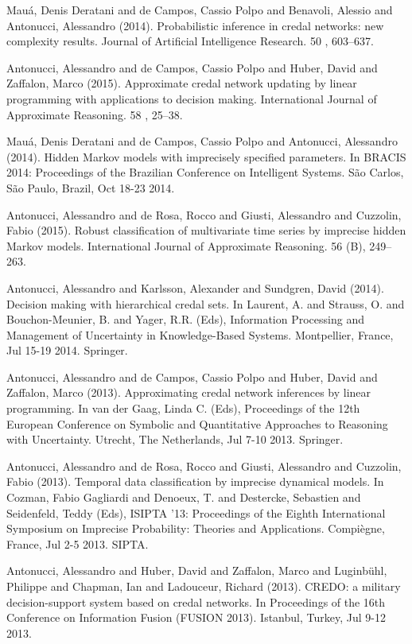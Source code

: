 \begin{cventries}
\begin{cvitems}
\item Mauá, Denis Deratani and de Campos, Cassio Polpo and Benavoli, Alessio and Antonucci, Alessandro (2014).   Probabilistic inference in credal networks: new complexity results.   Journal of Artificial Intelligence Research. 50 , 603–637.
\item Antonucci, Alessandro and de Campos, Cassio Polpo and Huber, David and Zaffalon, Marco (2015).   Approximate credal network updating by linear programming with applications to decision making.   International Journal of Approximate Reasoning. 58 , 25–38.
\item Mauá, Denis Deratani and de Campos, Cassio Polpo and Antonucci, Alessandro (2014).   Hidden Markov models with imprecisely specified parameters.   In BRACIS 2014: Proceedings of the Brazilian Conference on Intelligent Systems.   São Carlos, São Paulo, Brazil,   Oct 18-23 2014.
\item Antonucci, Alessandro and de Rosa, Rocco and Giusti, Alessandro and Cuzzolin, Fabio (2015).   Robust classification of multivariate time series by imprecise hidden Markov models.   International Journal of Approximate Reasoning. 56 (B), 249–263.
\item Antonucci, Alessandro and Karlsson, Alexander and Sundgren, David (2014).   Decision making with hierarchical credal sets.   In Laurent, A. and Strauss, O. and Bouchon-Meunier, B. and Yager, R.R. (Eds), Information Processing and Management of Uncertainty in Knowledge-Based Systems.   Montpellier, France,   Jul 15-19 2014.   Springer.
\item Antonucci, Alessandro and de Campos, Cassio Polpo and Huber, David and Zaffalon, Marco (2013).   Approximating credal network inferences by linear programming.   In van der Gaag, Linda C. (Eds), Proceedings of the 12th European Conference on Symbolic and Quantitative Approaches to Reasoning with Uncertainty.   Utrecht, The Netherlands,   Jul 7-10 2013.   Springer.
\item Antonucci, Alessandro and de Rosa, Rocco and Giusti, Alessandro and Cuzzolin, Fabio (2013).   Temporal data classification by imprecise dynamical models.   In Cozman, Fabio Gagliardi and Denoeux, T. and Destercke, Sebastien and Seidenfeld, Teddy (Eds), ISIPTA ’13: Proceedings of the Eighth International Symposium on Imprecise Probability: Theories and Applications.   Compiègne, France,   Jul 2-5 2013.   SIPTA.
\item Antonucci, Alessandro and Huber, David and Zaffalon, Marco and Luginbühl, Philippe and Chapman, Ian and Ladouceur, Richard (2013).   CREDO: a military decision-support system based on credal networks.   In Proceedings of the 16th Conference on Information Fusion (FUSION 2013).   Istanbul, Turkey,   Jul 9-12 2013.

\end{cvitems}
\end{cventries}
